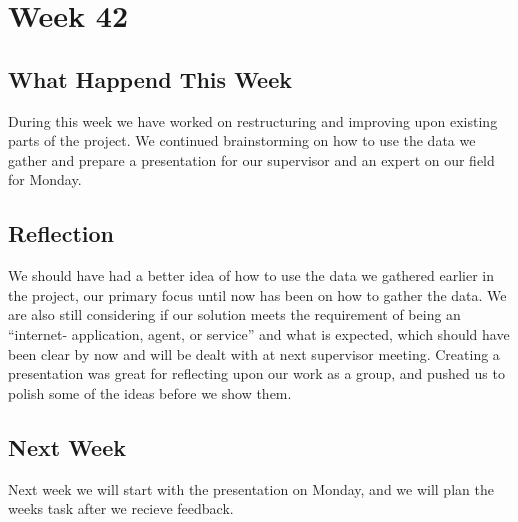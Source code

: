 \section*{Week 42}
\subsection*{What Happend This Week} 
During this week we have worked on restructuring and improving upon existing
parts of the project. We continued brainstorming on how to use the data we
gather and prepare a presentation for our supervisor and an expert on our field
for Monday.

\subsection*{Reflection}
We should have had a better idea of how to use the data we gathered earlier in
the project, our primary focus until now has been on how to gather the data. We
are also still considering if our solution meets the requirement of being an
``internet- application, agent, or service'' and what is expected, which should
have been clear by now and will be dealt with at next supervisor meeting.
Creating a presentation was great for reflecting upon our work as a group, and
pushed us to polish some of the ideas before we show them.

\subsection*{Next Week}
Next week we will start with the presentation on Monday, and we will plan the
weeks task after we recieve feedback.


